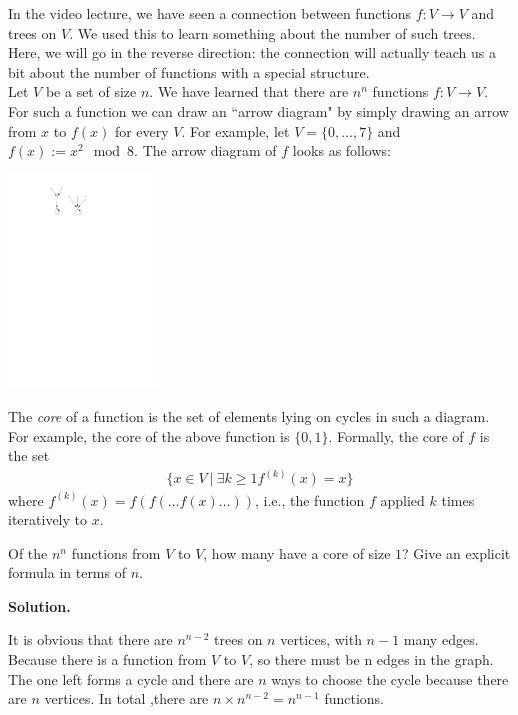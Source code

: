 

In the video lecture, we have seen a connection between functions $f: V \rightarrow V$
and trees on $V$. We used this to learn something about the number of such trees.
Here, we will go in the reverse direction: the connection will actually teach us a bit
about the number of functions with a special structure.\\

Let $V$ be a set of size $n$. We have learned that there are $n^n$ functions $f: V \rightarrow V$.
For such a function we can draw an ``arrow diagram" by simply drawing an arrow from
$x$ to $f(x)$ for every $V$. For example, let $V = \{0,\dots,7\}$ and $f(x) := x^2 \mod 8$.
The arrow diagram of $f$ looks as follows:
\begin{center}
\includegraphics[width=0.3\textwidth]{figures/arrow-diagram.pdf}
\end{center}
The {\em core} of a function is the set of elements lying on cycles in such a diagram.
For example, the core of the above function is $\{0,1\}$. Formally, the core of $f$ is the
set
\begin{align*}
\{x \in V \ | \ \exists k \geq 1 f^{(k)}(x) = x \}
\end{align*}
where $f^{(k)}(x) = f( f( \dots f(x) \dots ))$, i.e., the function $f$ applied $k$ times
iteratively to $x$.

\begin{exercise}
Of the $n^n$ functions from $V$ to $V$, how many have a core of size $1$?
Give an explicit formula in terms of $n$.
\end{exercise}
\textbf{Solution.}
\par It is obvious that there are $n^{n-2}$ trees on $n$ vertices, with $n-1$ many edges. Because there is a function from $V$ to $V$, so there must be n edges in the graph. The one left forms a cycle and there are $n$ ways to choose the cycle because there are $n$ vertices. In total ,there are $n\times n^{n-2}= n^{n-1}$ functions.

